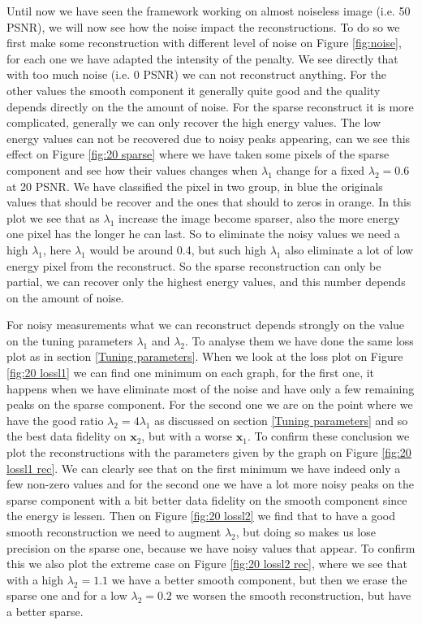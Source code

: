 \documentclass[a4paper,11pt,oneside]{report}
\theoremstyle{named}
\begin{document}
Until now we have seen the framework working on almost noiseless image (i.e. 50 PSNR), we will now see how the noise impact the reconstructions. To do so we first make some reconstruction with different level of noise on Figure \ref{fig:noise}, for each one we have adapted the intensity of the penalty. We see directly that with too much noise (i.e. 0 PSNR) we can not reconstruct anything. For the other values the smooth component it generally quite good and the quality depends directly on the the amount of noise. For the sparse reconstruct it is more complicated, generally we can only recover the high energy values. The low energy values can not be recovered due to noisy peaks appearing, can we see this effect on Figure \ref{fig:20 sparse} where we have taken some pixels of the sparse component and see how their values changes when $\lambda_1$ change for a fixed $\lambda_2 = 0.6$ at 20 PSNR. We have classified the pixel in two group, in blue the originals values that should be recover and the ones that should to zeros in orange. In this plot we see that as $\lambda_1$ increase the image become sparser, also the more energy one pixel has the longer he can last. So to eliminate the noisy values we need a high $\lambda_1$, here $\lambda_1$ would be around 0.4, but such high $\lambda_1$ also eliminate a lot of low energy pixel from the reconstruct. So the sparse reconstruction can only be partial, we can recover only the highest energy values, and this number depends on the amount of noise.

For noisy measurements what we can reconstruct depends strongly on the value on the tuning parameters $\lambda_1$ and $\lambda_2$. To analyse them we have done the same loss plot as in section \ref{Tuning parameters}. When we look at the loss plot on Figure \ref{fig:20 lossl1} we can find one minimum on each graph, for the first one, it happens when we have eliminate most of the noise and have only a few remaining peaks on the sparse component. For the second one we are on the point where we have the good ratio  $\lambda_2 = 4 \lambda_1$ as discussed on section \ref{Tuning parameters} and so the best data fidelity on $\boldsymbol{x}_2$, but with a worse $\boldsymbol{x}_1$. To confirm these conclusion we plot the reconstructions with the parameters given by the graph on Figure \ref{fig:20 lossl1 rec}. We can clearly see that on the first minimum we have indeed only a few non-zero values and for the second one we have a lot more noisy peaks on the sparse component with a bit better data fidelity on the smooth component since the energy is lessen. Then on Figure \ref{fig:20 lossl2} we find that to have a good smooth reconstruction we need to augment $\lambda_2$, but doing so makes us lose precision on the sparse one, because we have noisy values that appear. To confirm this we also plot the extreme case on Figure \ref{fig:20 lossl2 rec}, where we see that with a high $\lambda_2 = 1.1$ we have a better smooth component, but then we erase the sparse one and for a low $\lambda_2 = 0.2$ we worsen the smooth reconstruction, but have a better sparse. 
\end{document}
